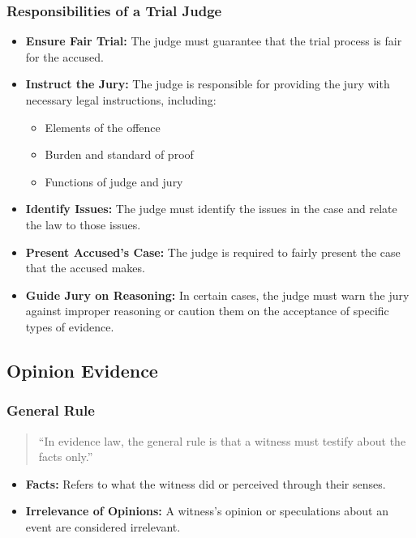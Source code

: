 \subsubsection{Responsibilities of a Trial
Judge}\label{responsibilities-of-a-trial-judge}

\begin{itemize}
\tightlist
\item
  \textbf{Ensure Fair Trial:} The judge must guarantee that the trial
  process is fair for the accused.
\item
  \textbf{Instruct the Jury:} The judge is responsible for providing the
  jury with necessary legal instructions, including:

  \begin{itemize}
  \tightlist
  \item
    Elements of the offence
  \item
    Burden and standard of proof
  \item
    Functions of judge and jury
  \end{itemize}
\item
  \textbf{Identify Issues:} The judge must identify the issues in the
  case and relate the law to those issues.
\item
  \textbf{Present Accused's Case:} The judge is required to fairly
  present the case that the accused makes.
\item
  \textbf{Guide Jury on Reasoning:} In certain cases, the judge must
  warn the jury against improper reasoning or caution them on the
  acceptance of specific types of evidence.
\end{itemize}

\subsection{  Opinion Evidence}\label{opinion-evidence}

\subsubsection{General Rule}\label{general-rule-1}

\begin{quote}
``In evidence law, the general rule is that a witness must testify about
the facts only.''
\end{quote}

\begin{itemize}
\tightlist
\item
  \textbf{Facts:} Refers to what the witness did or perceived through
  their senses.
\item
  \textbf{Irrelevance of Opinions:} A witness's opinion or speculations
  about an event are considered irrelevant.
\end{itemize}

